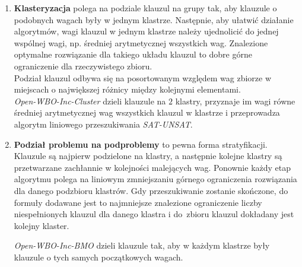 \documentclass[shortabstract]{iithesis}
\begin{document}
\begin{enumerate}
	\item \textbf{Klasteryzacja} polega na podziale klauzul na grupy tak, aby klauzule o podobnych wagach były w jednym klastrze. Następnie, aby ułatwić działanie algorytmów, wagi klauzul w jednym klastrze należy ujednolicić do jednej wspólnej wagi, np. średniej arytmetycznej wszystkich wag. Znalezione optymalne rozwiązanie dla takiego układu klauzul to dobre górne ograniczenie dla rzeczywistego zbioru. \\ 
	Podział klauzul odbywa się na posortowanym względem wag zbiorze w miejscach o największej różnicy między kolejnymi elementami. \\
	
	\textit{Open-WBO-Inc-Cluster} dzieli klauzule na $2$ klastry, przyznaje im wagi równe średniej arytmetycznej wag wszystkich klauzul w klastrze i przeprowadza algorytm  liniowego przeszukiwania \textit{SAT-UNSAT}. \\
	
	\item \textbf{Podział problemu na podproblemy} to pewna forma stratyfikacji. Klauzule są najpierw podzielone na klastry, a następnie kolejne klastry są przetwarzane zachłannie w kolejności malejących wag. Ponownie każdy etap algorytmu polega na liniowym zmniejszaniu górnego ograniczenia rozwiązania dla danego podzbioru klastrów. Gdy przeszukiwanie zostanie skończone, do formuły dodawane jest to najmniejsze znalezione ograniczenie liczby niespełnionych klauzul dla danego klastra i do~zbioru klauzul dokładany jest kolejny klaster.
	
	
	\textit{Open-WBO-Inc-BMO} dzieli klauzule tak, aby w każdym klastrze były klauzule o tych samych początkowych wagach.\\
	
\end{enumerate}
\end{document}
